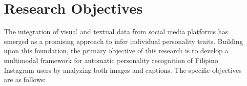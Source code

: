 






\section{Research Objectives}
\label{sec: objectives}
The integration of visual and textual data from social media platforms has emerged as a promising approach to infer individual personality traits. Building upon this foundation, the primary objective of this research is to develop a multimodal framework for automatic personality recognition of Filipino Instagram users by analyzing both images and captions. The specific objectives are as follows:

